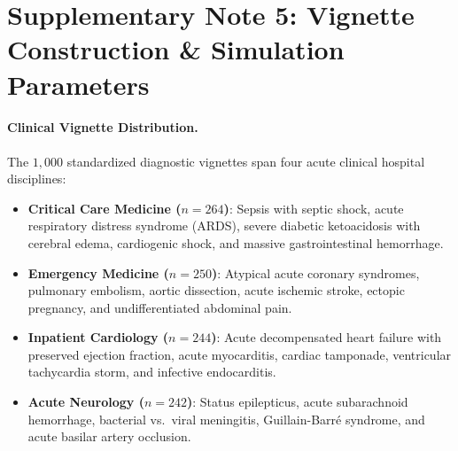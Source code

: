 \documentclass[11pt]{article}
\begin{document}
\newpage

\section{Supplementary Note 5: Vignette Construction \& Simulation Parameters}

\paragraph{Clinical Vignette Distribution.}
The $1{,}000$ standardized diagnostic vignettes span four acute clinical hospital disciplines:
\begin{itemize}
  \item \textbf{Critical Care Medicine ($n=264$)}: Sepsis with septic shock, acute respiratory distress syndrome (ARDS), severe diabetic ketoacidosis with cerebral edema, cardiogenic shock, and massive gastrointestinal hemorrhage.
  \item \textbf{Emergency Medicine ($n=250$)}: Atypical acute coronary syndromes, pulmonary embolism, aortic dissection, acute ischemic stroke, ectopic pregnancy, and undifferentiated abdominal pain.
  \item \textbf{Inpatient Cardiology ($n=244$)}: Acute decompensated heart failure with preserved ejection fraction, acute myocarditis, cardiac tamponade, ventricular tachycardia storm, and infective endocarditis.
  \item \textbf{Acute Neurology ($n=242$)}: Status epilepticus, acute subarachnoid hemorrhage, bacterial vs.\ viral meningitis, Guillain-Barr\'e syndrome, and acute basilar artery occlusion.
\end{itemize}
\end{document}
